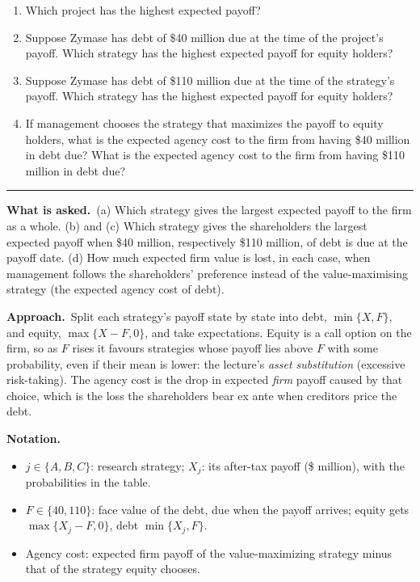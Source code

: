 \documentclass[11pt,a4paper]{article}
\newcommand{\notation}{\par\noindent\textbf{Notation.}}
\newcommand{\asked}{\par\medskip\noindent\textbf{What is asked.}~}
\newcommand{\approach}{\par\smallskip\noindent\textbf{Approach.}~}
\newcommand{\stmtend}{\par\endgroup\nopagebreak\noindent\rule{\linewidth}{0.4pt}\par\medskip}
\begin{document}
\begin{enumerate}
\def\labelenumi{\alph{enumi}.}
\item
  Which project has the highest expected payoff?
\item
  Suppose Zymase has debt of \$40 million due at the time of the project's payoff. Which strategy
  has the highest expected payoff for equity holders?
\item
  Suppose Zymase has debt of \$110 million due at the time of the strategy's payoff. Which strategy
  has the highest expected payoff for equity holders?
\item
  If management chooses the strategy that maximizes the payoff to equity holders, what is the
  expected agency cost to the firm from having \$40 million in debt due? What is the expected agency
  cost to the firm from having \$110 million in debt due?
\end{enumerate}
\stmtend

\asked (a) Which strategy gives the largest expected payoff to the firm as a whole. (b) and (c)
Which strategy gives the shareholders the largest expected payoff when \$40 million, respectively
\$110 million, of debt is due at the payoff date. (d) How much expected firm value is lost, in each
case, when management follows the shareholders' preference instead of the value-maximising strategy
(the expected agency cost of debt).

\approach Split each strategy's payoff state by state into debt, $\min\{X,F\}$, and equity,
$\max\{X-F,0\}$, and take expectations. Equity is a call option on the firm, so as $F$ rises it
favours strategies whose payoff lies above $F$ with some probability, even if their mean is lower:
the lecture's \emph{asset substitution} (excessive risk-taking). The agency cost is the drop in
expected \emph{firm} payoff caused by that choice, which is the loss the shareholders bear ex ante
when creditors price the debt.

\notation
\begin{itemize}
  \item $j\in\{A,B,C\}$: research strategy; $X_j$: its after-tax payoff (\$ million), with the probabilities in the table.
  \item $F\in\{40,110\}$: face value of the debt, due when the payoff arrives; equity gets $\max\{X_j-F,0\}$, debt $\min\{X_j,F\}$.
  \item Agency cost: expected firm payoff of the value-maximizing strategy minus that of the strategy equity chooses.
\end{itemize}
\end{document}

